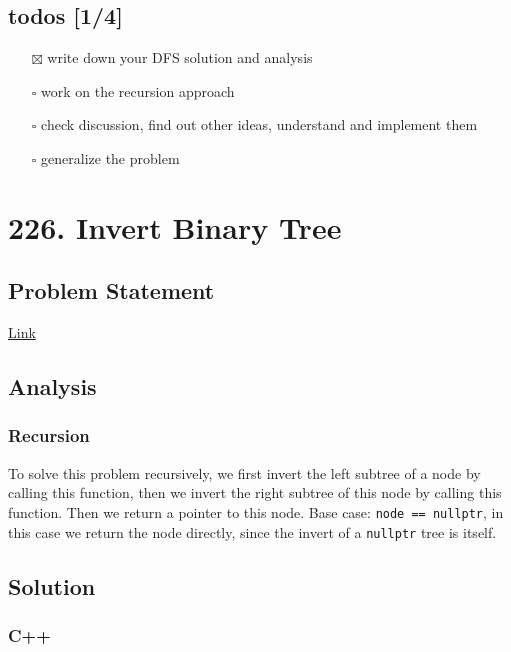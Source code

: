 \documentclass[12pt]{book}
\begin{document}
\section{todos [1/4]}
\label{sec:orgc13a22f}
\begin{itemize}
\item[{$\boxtimes$}] write down your DFS solution and analysis
\item[{$\square$}] work on the recursion approach
\item[{$\square$}] check discussion, find out other ideas, understand and implement them
\item[{$\square$}] generalize the problem
\end{itemize}

\chapter{226. Invert Binary Tree}
\label{sec:org8006149}
\section{Problem Statement}
\label{sec:orgc0fcf61}
\href{https://leetcode.com/problems/invert-binary-tree/}{Link}
\section{Analysis}
\label{sec:org4629ac4}
\subsection{Recursion}
\label{sec:org2838cb0}
To solve this problem recursively, we first invert the left subtree of a node by calling this function, then we invert the right subtree of this node by calling this function. Then we return a pointer to this node. Base case: \texttt{node == nullptr}, in this case we return the node directly, since the invert of a \texttt{nullptr} tree is itself.
\section{Solution}
\label{sec:org4325789}
\subsection{C++}
\label{sec:org0e05007}
\end{document}
